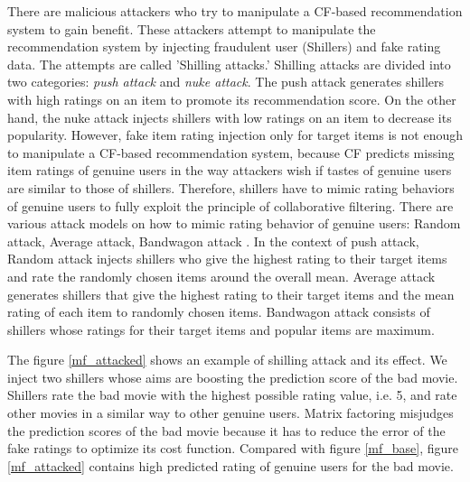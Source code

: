 \documentclass[master,english,final]{kaist-ucs}
\begin{document}
There are malicious attackers who try to manipulate a CF-based recommendation system to gain benefit.
These attackers attempt to manipulate the recommendation system by injecting fraudulent user (Shillers) and fake rating data.
The attempts are called 'Shilling attacks.'
Shilling attacks are divided into two categories: \textit{push attack} and \textit{nuke attack}.
The push attack generates shillers with high ratings on an item to promote its recommendation score.
On the other hand, the nuke attack injects shillers with low ratings on an item to decrease its popularity.
However, fake item rating injection only for target items is not enough to manipulate a CF-based recommendation system, because CF predicts missing item ratings of genuine users in the way attackers wish if tastes of genuine users are similar to those of shillers.
Therefore, shillers have to mimic rating behaviors of genuine users to fully exploit the principle of collaborative filtering.
There are various attack models on how to mimic rating behavior of genuine users: Random attack, Average attack, Bandwagon attack \cite{shilling_attack_1,shilling_attack_2,shilling_attack_3,shilling_attack_guide}.
In the context of push attack, Random attack injects shillers who give the highest rating to their target items and rate the randomly chosen items around the overall mean.
Average attack generates shillers that give the highest rating to their target items and the mean rating of each item to randomly chosen items.
Bandwagon attack consists of shillers whose ratings for their target items and popular items are maximum.

The figure \ref{mf_attacked} shows an example of shilling attack and its effect. We inject two shillers whose aims are boosting the prediction score of the bad movie.
Shillers rate the bad movie with the highest possible rating value, i.e. 5, and rate other movies in a similar way to other genuine users.
Matrix factoring misjudges the prediction scores of the bad movie because it has to reduce the error of the fake ratings to optimize its cost function.
Compared with figure \ref{mf_base}, figure \ref{mf_attacked} contains high predicted rating of genuine users for the bad movie.
\end{document}
